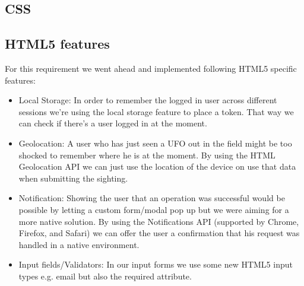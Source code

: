 \documentclass{article}
\begin{document}
\subsection{CSS}

\subsection{HTML5 features}
For this requirement we went ahead and implemented following HTML5 specific features:
\begin{itemize}
\item Local Storage: In order to remember the logged in user across different sessions we're using the local storage feature to place a token. That way we can check if there's a user logged in at the moment.
\item Geolocation: A user who has just seen a UFO out in the field might be too shocked to remember where he is at the moment. By using the HTML Geolocation API we can just use the location of the device on use that data when submitting the sighting.
\item Notification: Showing the user that an operation was successful would be possible by letting a custom form/modal pop up but we were aiming for a more native solution. By using the Notifications API (supported by Chrome, Firefox, and Safari) we can offer the user a confirmation that his request was handled in a native environment.
\item Input fields/Validators: In our input forms we use some new HTML5 input types e.g. email but also the required attribute.
\end{itemize}
\end{document}
